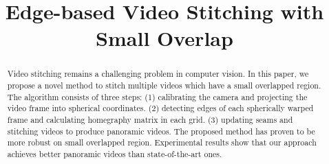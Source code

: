 \documentclass[conference]{IEEEtran}
\begin{document}
\title{Edge-based Video Stitching with Small Overlap\\
}

\author{
\and
{}
}

\maketitle

\begin{abstract}
Video stitching remains a challenging problem in computer vision. In this paper, we propose a novel method to stitch multiple videos which have a small overlapped region.
The algorithm consists of three steps: (1) calibrating the camera and projecting the video frame into spherical coordinates. (2) detecting edges of each spherically
warped frame and calculating homegraphy matrix in each grid. (3) updating seams and stitching videos to produce panoramic videos. The proposed method has proven to be
more robust on small overlapped region. Experimental results show that our approach achieves better panoramic videos than state-of-the-art ones.
\end{abstract}
\end{document}
